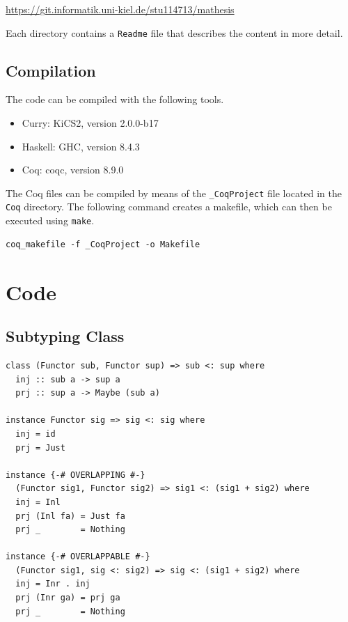 \documentclass[a4paper, 11pt, fleqn, twoside, abstract=on]{scrreprt}
\newcommand{\cinl}[1]{\texttt{#1}}
\begin{document}
\vspace*{.5cm}
\url{https://git.informatik.uni-kiel.de/stu114713/mathesis}
\vspace*{.5cm}

\noindent
Each directory contains a \texttt{Readme} file that describes the content in more detail.

\subsection{Compilation}

The code can be compiled with the following tools.

\begin{itemize}
\item Curry: KiCS2, version 2.0.0-b17
\item Haskell: GHC, version 8.4.3
\item Coq: coqc, version 8.9.0
\end{itemize}

The Coq files can be compiled by means of the \cinl{_CoqProject} file located in the \cinl{Coq} directory.
The following command creates a makefile, which can then be executed using \texttt{make}.

\begin{verbatim}
coq_makefile -f _CoqProject -o Makefile
\end{verbatim}

\section{Code}
\subsection{Subtyping Class}
\label{ap:subtyping}
\begin{verbatim}
class (Functor sub, Functor sup) => sub <: sup where
  inj :: sub a -> sup a
  prj :: sup a -> Maybe (sub a)

instance Functor sig => sig <: sig where
  inj = id
  prj = Just

instance {-# OVERLAPPING #-}
  (Functor sig1, Functor sig2) => sig1 <: (sig1 + sig2) where
  inj = Inl
  prj (Inl fa) = Just fa
  prj _        = Nothing

instance {-# OVERLAPPABLE #-}
  (Functor sig1, sig <: sig2) => sig <: (sig1 + sig2) where
  inj = Inr . inj
  prj (Inr ga) = prj ga
  prj _        = Nothing
\end{verbatim}
\end{document}
